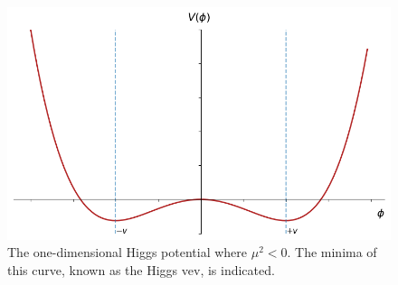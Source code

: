 \begin{figure}[!ht]
    \centering
    \includegraphics[width=\textwidth]{chapters/chapter1_theory/images/higgs-2d-vev.png}
    \caption[The one-dimensional Higgs potential where $\mu^2 <0$]{The one-dimensional Higgs potential where $\mu^2 <0$. The minima of this curve, known as the Higgs \gls{vev}, is indicated.}
    \label{fig:higgs-potential}
\end{figure}

